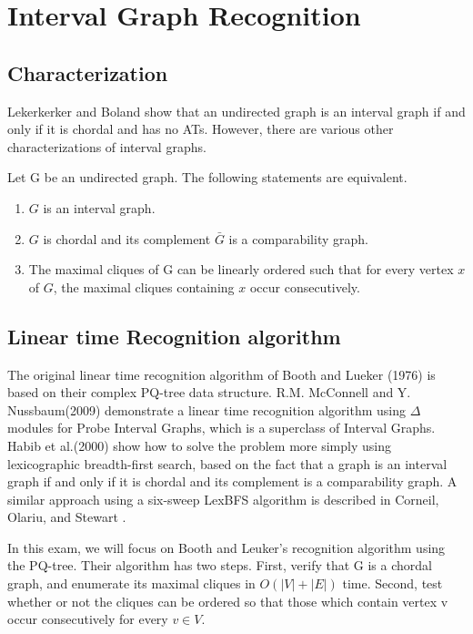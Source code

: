 \section{Interval Graph Recognition}

\subsection{Characterization}
Lekerkerker and Boland \cite{lekkerkerker1962representation} show that an undirected graph is an interval graph if and only if it is chordal and has no ATs. However, there are various other characterizations of interval graphs.

\begin{theorem}\cite{golumbic2004algorithmic}\cite{gilmore1964characterization}
Let G be an undirected graph. The following statements are equivalent.
\begin{enumerate}
\item $G$ is an interval graph.
\item $G$ is chordal and its complement $\bar{G}$ is a comparability graph.
\item The maximal cliques of G can be linearly ordered such that for every vertex $x$ of $G$, the maximal cliques containing $x$ occur consecutively.
\end{enumerate}
\end{theorem}



\subsection{Linear time Recognition algorithm}

The original linear time recognition algorithm of Booth and Lueker (1976)\cite{booth1976testing} is based on their complex PQ-tree data structure. R.M. McConnell and Y. Nussbaum(2009)\cite{mcconnell2009linear} demonstrate a linear time recognition algorithm using $\Delta$ modules for Probe Interval Graphs, which is a superclass of Interval Graphs. Habib et al.(2000) \cite{habib2000lex} show how to solve the problem more simply using lexicographic breadth-first search, based on the fact that a graph is an interval graph if and only if it is chordal and its complement is a comparability graph. A similar approach using a six-sweep LexBFS algorithm is described in Corneil, Olariu, and Stewart \cite{corneil2009lbfs}.

In this exam, we will focus on Booth and Leuker's recognition algorithm using the PQ-tree. Their algorithm has two steps. First, verify that G is a chordal graph, and enumerate its maximal cliques in $O(|V|+|E|)$ time. Second, test whether or not the cliques can be ordered so that those which contain vertex v occur consecutively for every $v \in V$. 

